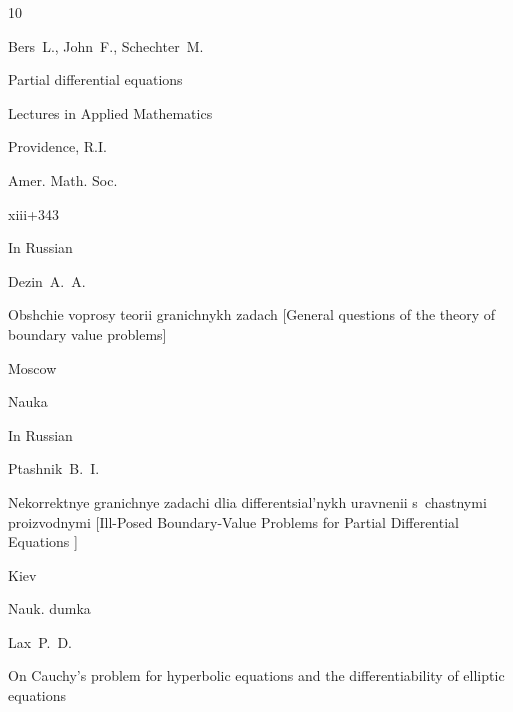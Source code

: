 \begin{thebibliography}{10}




\by Bers~L., John~F.,  Schechter~M.

\book Partial differential equations


\serial Lectures in Applied Mathematics

\publaddr  Providence, R.I.

\publ Amer. Math. Soc.

\totalpages xiii+343 







\lang In Russian

\by Dezin~A.~A.

\book Obshchie voprosy teorii granichnykh zadach \rm [General questions of the theory of boundary value problems]

\publaddr Moscow

\publ Nauka














\lang In Russian

\by Ptashnik~B.~I. 

\book Nekorrektnye granichnye zadachi dlia differentsial'nykh uravnenii s~chastnymi proizvodnymi \rm [Ill-Posed Boundary-Value Problems for Partial Differential Equations ]

\publaddr Kiev

\publ Nauk. dumka








\by Lax~P.~D.

\paper  On Cauchy's problem for hyperbolic equations and the differentiability of elliptic equations



\end{thebibliography}
